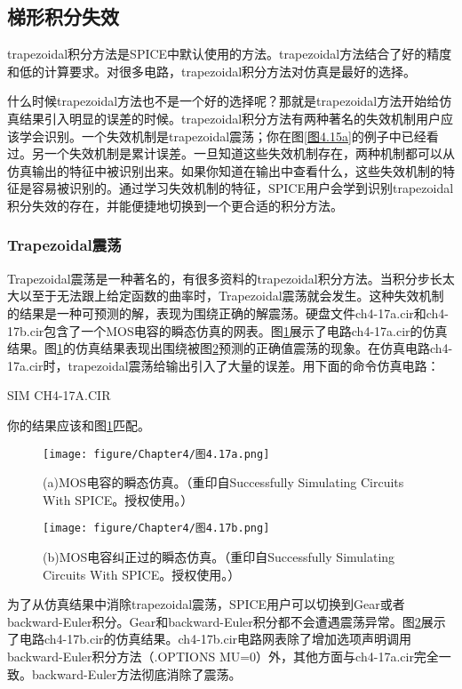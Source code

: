 \subsection{梯形积分失效}
trapezoidal积分方法是SPICE中默认使用的方法。trapezoidal方法结合了好的精度和低的计算要求。对很多电路，trapezoidal积分方法对仿真是最好的选择。

什么时候trapezoidal方法也不是一个好的选择呢？那就是trapezoidal方法开始给仿真结果引入明显的误差的时候。trapezoidal积分方法有两种著名的失效机制用户应该学会识别。一个失效机制是trapezoidal震荡；你在图\ref{图4.15a}的例子中已经看过。另一个失效机制是累计误差。一旦知道这些失效机制存在，两种机制都可以从仿真输出的特征中被识别出来。如果你知道在输出中查看什么，这些失效机制的特征是容易被识别的。通过学习失效机制的特征，SPICE用户会学到识别trapezoidal积分失效的存在，并能便捷地切换到一个更合适的积分方法。

\subsubsection{Trapezoidal震荡}
Trapezoidal震荡是一种著名的，有很多资料的trapezoidal积分方法\cite{Leon}。当积分步长太大以至于无法跟上给定函数的曲率时，Trapezoidal震荡就会发生。这种失效机制的结果是一种可预测的解，表现为围绕正确的解震荡。硬盘文件ch4-17a.cir和ch4-17b.cir包含了一个MOS电容的瞬态仿真的网表。图\ref{图4.17a}展示了电路ch4-17a.cir的仿真结果。图\ref{图4.17a}的仿真结果表现出围绕被图\ref{图4.17b}预测的正确值震荡的现象。在仿真电路ch4-17a.cir时，trapezoidal震荡给输出引入了大量的误差。用下面的命令仿真电路：

SIM CH4-17A.CIR

你的结果应该和图\ref{图4.17a}匹配。
\begin{figure}[htbp]
\small
    \centering
    \texttt{[image: figure/Chapter4/图4.17a.png]}
    \caption{(a)MOS电容的瞬态仿真。（重印自Successfully Simulating Circuits With SPICE。授权使用。）}
    \label{图4.17a}
\end{figure}

\begin{figure}[htbp]
\small
    \centering
    \texttt{[image: figure/Chapter4/图4.17b.png]}
    \caption{(b)MOS电容纠正过的瞬态仿真。（重印自Successfully Simulating Circuits With SPICE。授权使用。）}
    \label{图4.17b}
\end{figure}

为了从仿真结果中消除trapezoidal震荡，SPICE用户可以切换到Gear或者backward-Euler积分。Gear和backward-Euler积分都不会遭遇震荡异常。图\ref{图4.17b}展示了电路ch4-17b.cir的仿真结果。ch4-17b.cir电路网表除了增加选项声明调用backward-Euler积分方法（.OPTIONS MU=0）外，其他方面与ch4-17a.cir完全一致。backward-Euler方法彻底消除了震荡。

